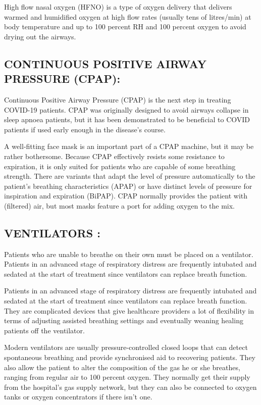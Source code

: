 \documentclass[12pt]{article}
\begin{document}
High flow nasal oxygen (HFNO) is a type of oxygen delivery that delivers warmed and humidified oxygen at high flow rates (usually tens of litres/min) at body temperature and up to 100 percent RH and 100 percent oxygen to avoid drying out the airways.




\subsection{CONTINUOUS POSITIVE AIRWAY PRESSURE (CPAP):}

Continuous Positive Airway Pressure (CPAP) is the next step in treating COVID-19 patients. CPAP was originally designed to avoid airways collapse in sleep apnoea patients, but it has been demonstrated to be beneficial to COVID patients if used early enough in the disease's course.


A well-fitting face mask is an important part of a CPAP machine, but it may be rather bothersome. Because CPAP effectively resists some resistance to expiration, it is only suited for patients who are capable of some breathing strength. There are variants that adapt the level of pressure automatically to the patient's breathing characteristics (APAP) or have distinct levels of pressure for inspiration and expiration (BiPAP). CPAP normally provides the patient with (filtered) air, but most masks feature a port for adding oxygen to the mix.



\subsection{VENTILATORS :}


Patients who are unable to breathe on their own must be placed on a ventilator. Patients in an advanced stage of respiratory distress are frequently intubated and sedated at the start of treatment since ventilators can replace breath function.



Patients in an advanced stage of respiratory distress are frequently intubated and sedated at the start of treatment since ventilators can replace breath function. They are complicated devices that give healthcare providers a lot of flexibility in terms of adjusting assisted breathing settings and eventually weaning healing patients off the ventilator.




Modern ventilators are usually pressure-controlled closed loops that can detect spontaneous breathing and provide synchronised aid to recovering patients. They also allow the patient to alter the composition of the gas he or she breathes, ranging from regular air to 100 percent oxygen. They normally get their supply from the hospital's gas supply network, but they can also be connected to oxygen tanks or oxygen concentrators if there isn't one.
\end{document}
